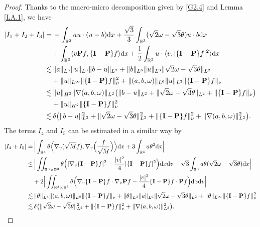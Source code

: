 \documentclass[reqno,11pt]{amsart}
\theoremstyle{plain}
\numberwithin{equation}{section}
\begin{document}
\begin{proof}
Thanks to the  macro-micro decomposition given by \eqref{G2.4} and Lemma \ref{LA.1}, we have
\begin{align}\label{G3.6}
  |I_1+I_2+I_3|%
 =&\,-\int_{\mathbb{R}^3}au\cdot(u-b){\rm d}x+\frac{\sqrt{3}}{3}\int_{\mathbb{R}^3}(\sqrt{2}\omega-\sqrt{3}\theta)u\cdot b{\rm d}x\nonumber\\
 &+\int_{\mathbb{R}^3}\langle v\mathbf{P}f,\{\mathbf{I}-\mathbf{P}\}f\rangle{\rm d}x+\frac{1}{2}\int_{\mathbb{R}^3}u\cdot \langle v,|\{\mathbf{I}-\mathbf{P}\}f|^2\rangle{\rm d}x\nonumber\nonumber\\
 \lesssim&\, \|a\|_{L^6}\|u\|_{L^3}\|b-u\|_{L^2}+\|b\|_{L^6}\|u\|_{L^3}\|\sqrt{2}\omega-\sqrt{3}\theta\|_{L^2}\nonumber\\
 &+\|u\|_{L^{\infty}} \|\{\mathbf{I}-\mathbf{P}\}f\|_{\nu}^{2}+\|(a,b,\omega)\|_{L^6}\|u\|_{L^3} \|\{\mathbf{I}-\mathbf{P}\}f\|_{\nu}\nonumber\\
 \lesssim&\,\|u\|_{H^2}\|\nabla(a,b,\omega)\|_{L^2}
 \big(\|b-u\|_{L^2} 
+\|\sqrt{2}\omega-\sqrt{3}\theta\|_{L^2} +\|\{\mathbf{I}-\mathbf{P}\}f\|_{\nu} \big)\nonumber\\
&+\|u\|_{H^2}\|\{\mathbf{I}-\mathbf{P}\}f\|_{\nu}^2\nonumber\\
\lesssim&\,\delta\big(\|b-u\|_{L^2}^{2}
+\|\sqrt{2}\omega-\sqrt{3}\theta\|_{L^2}^2+\|\{\mathbf{I}-\mathbf{P}\}f\|_{\nu}^{2}+\|\nabla(a,b,\omega)\|_{L^2}^2\big).
\end{align}
The terms $I_4$ and $I_5$ can   be estimated in a similar way by  
\begin{align}\label{G3.7}
 |I_4+I_5| 
=&\,\Big|\int_{\mathbb{R}^3}\theta\Big\langle  \nabla_v(\sqrt{M}f),\nabla_v\Big(\frac{f}{\sqrt{M}}\Big)\Big\rangle{\rm d}x+3\int_{\mathbb{R}^3}a\theta^2{\rm d}x\Big|\nonumber\\
\leq&\, \Big|\iint_{\mathbb{R}^3\times\mathbb{R}^3}\theta
\Big(|\nabla_v\{\mathbf{I}-\mathbf{P}\}f|^2-\frac{|v|^2}{4}|\{\mathbf{I}-\mathbf{P}\}f|^2\Big){\rm d}x{\rm d}v-\sqrt{3}\int_{\mathbb
{R}^3}a\theta(\sqrt{2}\omega-\sqrt{3}\theta){\rm d}x\Big|\nonumber\\
&+2\Big|\iint_{\mathbb{R}^3\times\mathbb{R}^3}\theta\Big(\nabla_v\{\mathbf{I}
-\mathbf{P}\}f\cdot\nabla_v\mathbf{P}f-\frac{|v|^2}{4}\{\mathbf{I}-\mathbf{P}\}f\cdot   \mathbf{P}f         \Big){\rm d}x{\rm d}v\Big|\nonumber\\
\lesssim&\, \|\theta\|_{L^3}\|(a,b,\omega)\|_{L^6}\|\{\mathbf{I}-\mathbf{P}\}f\|_{\nu}+\|\theta\|_{L^3}\| a\|_{L^6}\|\sqrt{2}\omega-\sqrt{3}\theta\|_{L^2}+\|\theta\|_{L^\infty}\|\{\mathbf{I}-\mathbf{P}\}f\|_{\nu}^2\nonumber\\
\lesssim&\,\delta\big( \|\sqrt{2}\omega-\sqrt{3}\theta\|_{L^2}^2+\|\{\mathbf{I}-\mathbf{P}\}f\|_{\nu}^{2}+\|\nabla(a,b,\omega)\|_{L^2}^2\big).
\end{align}


\end{proof}
\end{document}
